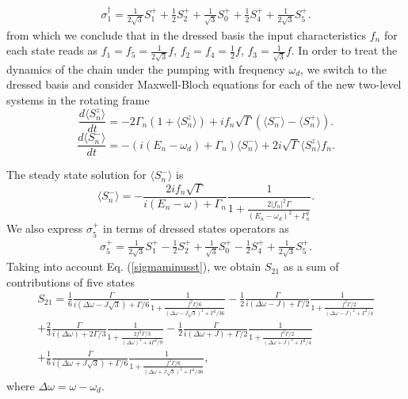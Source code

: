 \documentclass[%
 aps, pra,
 amsmath,amssymb,
 preprint,%
superscriptaddress
]{revtex4-2}
\begin{document}
\begin{eqnarray}
\sigma_1^{\dagger}=\frac{1}{2\sqrt{3}}S_1^{+} + \frac{1}{2}S_2^{+} + \frac{1}{\sqrt{3}}S_0^{+} + \frac{1}{2}S_4^{+} + \frac{1}{2\sqrt{3}}S_5^{+}.
\label{sigma1}
\end{eqnarray}
from which we conclude that in the dressed basis the input
characteristics $f_{n}$ for each state reads as $f_{1}=f_{5}=\frac{1}{2\sqrt{3}}f$, $f_{2}=f_{4}=\frac{1}{2}f$, $f_{3}=\frac{1}{\sqrt{3}}f$. In order to treat the dynamics of the chain under the pumping with frequency $\omega_d$,
we switch to the
dressed basis and consider Maxwell-Bloch equations for each of the new
two-level systems in the rotating frame
\begin{equation}
\frac{d \langle S_n^{z} \rangle}{dt} = -2\Gamma_n \left(1+
\langle S_n^{z} \rangle \right) + i f_{n}
\sqrt{\Gamma}\left(\langle S_n^{-} \rangle  -
\langle S_n^{+} \rangle \right). \label{sigmaz}
\end{equation}
\begin{equation}
\frac{d \langle S_n^{-} \rangle}{dt} = -\left(i (E_n-\omega_d) +
\Gamma_n\right) \langle S_n^{-} \rangle + 2 i
\sqrt{\Gamma} \langle S_n^{z} \rangle f_n.
\label{sigmaminus}
\end{equation}

The steady state solution for $\langle S_n^{-} \rangle$ is
\begin{equation}
\langle S_n^{-} \rangle  = -
\frac{2i f_{n} \sqrt{\Gamma}}{i\left(E_n - \omega\right) + \Gamma_n}
\frac{1}{1+ \frac{2 |f_{n}|^2 \Gamma}{\left(E_n - \omega_d\right)^2 +
		\Gamma_n^2}}. \label{sigmaminusst}
\end{equation}
We also express $\sigma_{5}^{+} $ in terms of dressed states operators as \begin{eqnarray}
\sigma_5^{+}=\frac{1}{2\sqrt{3}}S_1^{+} - \frac{1}{2}S_2^{+} + \frac{1}{\sqrt{3}}S_0^{+} - \frac{1}{2}S_4^{+} + \frac{1}{2\sqrt{3}}S_5^{+}.
\label{sigma5}
\end{eqnarray}
Taking into account Eq. (\ref{sigmaminusst}), we obtain $S_{21}$ as a sum of contributions of five states
\begin{eqnarray}
S_{21} = \frac{1}{6} \frac{\Gamma}{i\left(\Delta
	\omega - J \sqrt{3}\right) + \Gamma/6}
\frac{1}{1+ \frac{ f^2 \Gamma /6}{\left(\Delta
		\omega - J \sqrt{3}\right)^2 + \Gamma^2/36}}  \nonumber
-\frac{1}{2} \frac{\Gamma}{i\left(\Delta
	\omega - J \right) + \Gamma/2}
\frac{1}{1+ \frac{ f^2 \Gamma /2}{\left(\Delta
		\omega - J \right)^2 + \Gamma^2/4}} \\ \nonumber
+ \frac{2}{3} \frac{\Gamma}{i\left(\Delta
	\omega \right) + 2\Gamma/3}
\frac{1}{1+ \frac{ 2 f^2 \Gamma /3}{\left(\Delta
		\omega \right)^2 + 4 \Gamma^2/9}} %
-\frac{1}{2} \frac{\Gamma}{i\left(\Delta
	\omega + J \right) + \Gamma/2}
\frac{1}{1+ \frac{ f^2 \Gamma /2}{\left(\Delta
		\omega + J \right)^2 + \Gamma^2/4}} \\ %
+ \frac{1}{6} \frac{\Gamma}{i\left(\Delta
	\omega + J \sqrt{3}\right) + \Gamma/6}
\frac{1}{1+ \frac{ f^2 \Gamma /6}{\left(\Delta
		\omega + J \sqrt{3}\right)^2 + \Gamma^2/36}},
\label{bout}
\end{eqnarray}
where $\Delta \omega = \omega - \omega_d$.
\end{document}
